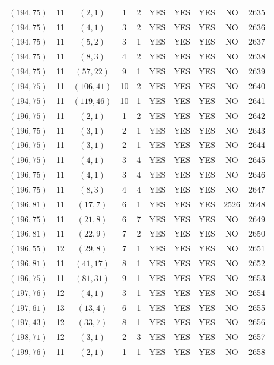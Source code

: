 \begin{longtable}{|c|c|c|c|c|c|c|c|c|c|}
$(194, 75)$ & 11 & $(2, 1)$ & 1 & 2 & YES & YES & YES & NO & 2635\\
$(194, 75)$ & 11 & $(4, 1)$ & 3 & 2 & YES & YES & YES & NO & 2636\\
$(194, 75)$ & 11 & $(5, 2)$ & 3 & 1 & YES & YES & YES & NO & 2637\\
$(194, 75)$ & 11 & $(8, 3)$ & 4 & 2 & YES & YES & YES & NO & 2638\\
$(194, 75)$ & 11 & $(57, 22)$ & 9 & 1 & YES & YES & YES & NO & 2639\\
$(194, 75)$ & 11 & $(106, 41)$ & 10 & 2 & YES & YES & YES & NO & 2640\\
$(194, 75)$ & 11 & $(119, 46)$ & 10 & 1 & YES & YES & YES & NO & 2641\\
$(196, 75)$ & 11 & $(2, 1)$ & 1 & 2 & YES & YES & YES & NO & 2642\\
$(196, 75)$ & 11 & $(3, 1)$ & 2 & 1 & YES & YES & YES & NO & 2643\\
$(196, 75)$ & 11 & $(3, 1)$ & 2 & 1 & YES & YES & YES & NO & 2644\\
$(196, 75)$ & 11 & $(4, 1)$ & 3 & 4 & YES & YES & YES & NO & 2645\\
$(196, 75)$ & 11 & $(4, 1)$ & 3 & 4 & YES & YES & YES & NO & 2646\\
$(196, 75)$ & 11 & $(8, 3)$ & 4 & 4 & YES & YES & YES & NO & 2647\\
$(196, 81)$ & 11 & $(17, 7)$ & 6 & 1 & YES & YES & YES & 2526 & 2648\\
$(196, 75)$ & 11 & $(21, 8)$ & 6 & 7 & YES & YES & YES & NO & 2649\\
$(196, 81)$ & 11 & $(22, 9)$ & 7 & 2 & YES & YES & YES & NO & 2650\\
$(196, 55)$ & 12 & $(29, 8)$ & 7 & 1 & YES & YES & YES & NO & 2651\\
$(196, 81)$ & 11 & $(41, 17)$ & 8 & 1 & YES & YES & YES & NO & 2652\\
$(196, 75)$ & 11 & $(81, 31)$ & 9 & 1 & YES & YES & YES & NO & 2653\\
$(197, 76)$ & 12 & $(4, 1)$ & 3 & 1 & YES & YES & YES & NO & 2654\\
$(197, 61)$ & 13 & $(13, 4)$ & 6 & 1 & YES & YES & YES & NO & 2655\\
$(197, 43)$ & 12 & $(33, 7)$ & 8 & 1 & YES & YES & YES & NO & 2656\\
$(198, 71)$ & 12 & $(3, 1)$ & 2 & 3 & YES & YES & YES & NO & 2657\\
$(199, 76)$ & 11 & $(2, 1)$ & 1 & 1 & YES & YES & YES & NO & 2658\\

\end{longtable}
